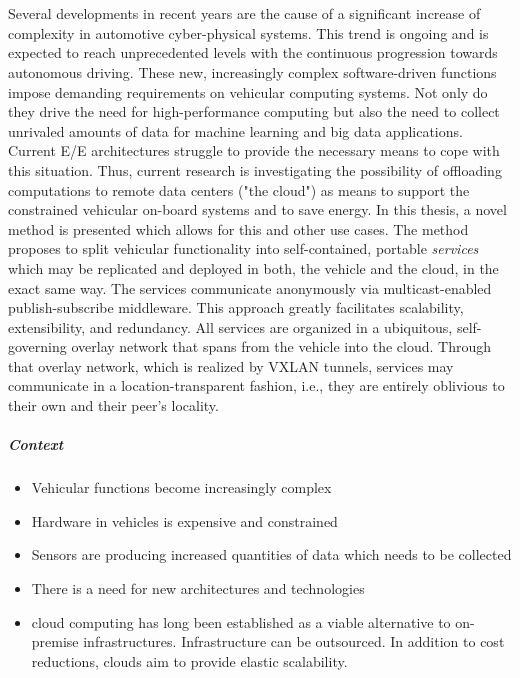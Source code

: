 \chapter{\abstractname}
Several developments in recent years are the cause of a significant increase of complexity in automotive cyber-physical systems. This trend is ongoing and is expected to reach unprecedented levels with the continuous progression towards autonomous driving. These new, increasingly complex software-driven functions impose demanding requirements on vehicular computing systems. Not only do they drive the need for high-performance computing but also the need to collect unrivaled amounts of data for machine learning and big data applications. Current E/E architectures struggle to provide the necessary means to cope with this situation. Thus, current research is investigating the possibility of offloading computations to remote data centers ("the cloud") as means to support the constrained vehicular on-board systems and to save energy. 
In this thesis, a novel method is presented which allows for this and other use cases. The method proposes to split vehicular functionality into self-contained, portable \emph{services} which may be replicated and deployed in both, the vehicle and the cloud, in the exact same way. The services communicate anonymously via multicast-enabled publish-subscribe middleware. This approach greatly facilitates scalability, extensibility, and redundancy. All services are organized in a ubiquitous, self-governing overlay network that spans from the vehicle into the cloud. Through that overlay network, which is realized by VXLAN tunnels, services may communicate in a location-transparent fashion, i.e., they are entirely oblivious to their own and their peer's locality.



\noindent
\paragraph{Context}
\begin{itemize}
\item Vehicular functions become increasingly complex
\item Hardware in vehicles is expensive and constrained
\item Sensors are producing increased quantities of data which needs to be collected
\item There is a need for new architectures and technologies
\item cloud computing has long been established as a viable alternative to on-premise infrastructures. Infrastructure can be outsourced. In addition to cost reductions, clouds aim to provide elastic scalability.
\end{itemize}

